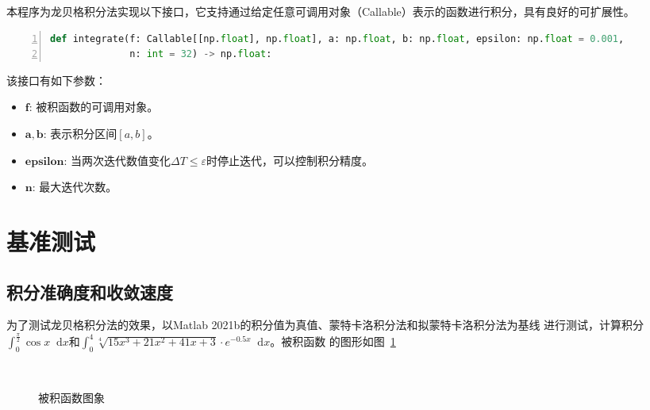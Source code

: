 \documentclass[a4paper,twoside]{article}
\newcommand*{\dif}{\mathop{}\!\mathrm{d}}
\begin{document}
\begin{spacing}{1.2}
本程序为龙贝格积分法实现以下接口，它支持通过给定任意可调用对象（Callable）表示的函数进行积分，具有良好的可扩展性。
\begin{lstlisting}[language=Python,numbers=left,style=PythonStyle,label={code:interface}]
def integrate(f: Callable[[np.float], np.float], a: np.float, b: np.float, epsilon: np.float = 0.001,
              n: int = 32) -> np.float:
\end{lstlisting}

该接口有如下参数：
\begin{itemize}
	\item $\mathbf{f}$: 被积函数的可调用对象。
	\item $\mathbf{a}, \mathbf{b}$: 表示积分区间$[a,b]$。
	\item $\mathbf{epsilon}$: 当两次迭代数值变化$\Delta T\le \varepsilon$时停止迭代，可以控制积分精度。
	\item  $\mathbf{n}$: 最大迭代次数。
\end{itemize}


\section{基准测试}

\subsection{积分准确度和收敛速度}

为了测试龙贝格积分法的效果，以Matlab 2021b的积分值为真值、蒙特卡洛积分法和拟蒙特卡洛积分法为基线
进行测试，计算积分$\int_0^{\frac{\pi}{2}}\cos x \dif x$和$\int_0^4\sqrt[4]{15x^3+21x^2+41x+3}\cdot e^{-0.5x}\dif x$。被积函数
的图形如图~\ref{fig:funcs}

\begin{figure}[H]
	\centering 
	~
	\caption{被积函数图象} 
	\label{fig:funcs}
\end{figure}


\end{spacing}
\end{document}

